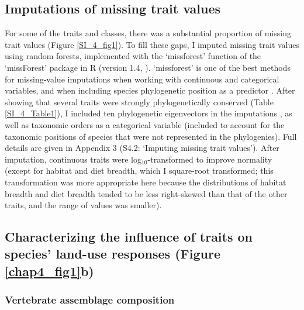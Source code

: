 \subsection{Imputations of missing trait values}
For some of the traits and classes, there was a substantial proportion of missing trait values (Figure \ref{SI_4_fig1}). To fill these gaps, I imputed missing trait values using random forests, implemented with the `missforest’ function of the `missForest’ package in R (version 1.4, \citet{Stekhoven2012, Stekhoven2016}). `missforest' is one of the best methods for missing-value imputations when working with continuous and categorical variables, and when including species phylogenetic position as a predictor \citep{Penone2014, Debastiani2021}. After showing that several traits were strongly phylogenetically conserved (Table \ref{SI_4_Table1}), I included ten phylogenetic eigenvectors in the imputations \citep{Penone2014}, as well as taxonomic orders as a categorical variable (included to account for the taxonomic positions of species that were not represented in the phylogenies). Full details are given in Appendix 3 (S4.2: `Imputing missing trait values'). After imputation, continuous traits were log$_{10}$-transformed to improve normality (except for habitat and diet breadth, which I square-root transformed; this transformation was more appropriate here because the distributions of habitat breadth and diet breadth tended to be less right-skewed than that of the other traits, and the range of values was smaller).

\subsection{Characterizing the influence of traits on species' land-use responses (Figure \ref{chap4_fig1}b)}

\subsubsection{Vertebrate assemblage composition}

